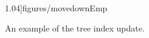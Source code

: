 \begin{figure}[ht]
1.04\linewidth]{figures/movedownEmp}
    \caption{An example of the tree index update.}
    \label{fig:movedownEmp}
\end{figure}


